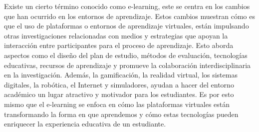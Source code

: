 Existe un cierto término conocido como e-learning, este se centra en los cambios que han ocurrido en los entornos de aprendizaje. Estos cambios muestran cómo es que el uso de plataformas o entornos de aprendizaje virtuales, están impulsando otras investigaciones relacionadas con medios y estrategias que apoyan la interacción entre participantes para el proceso de aprendizaje. Esto aborda aspectos como el diseño del plan de estudio, métodos de evaluación, tecnologías educativas, recursos de aprendizaje y promueve la colaboración interdisciplinaria en la investigación. Además, la gamificación, la realidad virtual, los sistemas digitales, la robótica, el Internet y simuladores, ayudan a hacer del entorno académico un lugar atractivo y motivador para los estudiantes. Es por esto mismo que el e-learning se enfoca en cómo las plataformas virtuales están transformando la forma en que aprendemos y cómo estas tecnologías pueden enriquecer la experiencia educativa de un estudiante. \cite{zamudio2021realidad}
